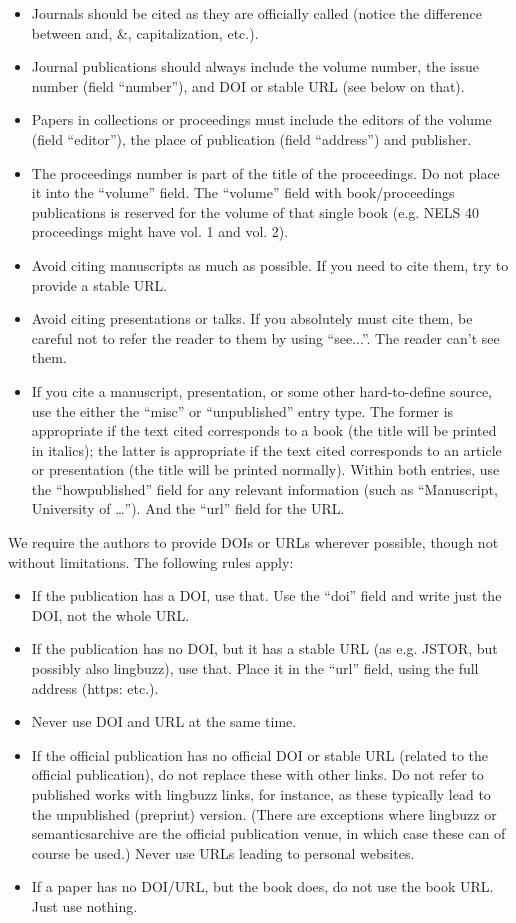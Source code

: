 \begin{itemize}
    \item Journals should be cited as they are officially called (notice the difference between and, \&, capitalization, etc.).
    \item Journal publications should always include the volume number, the issue number (field ``number''), and DOI or stable URL (see below on that).
    \item Papers in collections or proceedings must include the editors of the volume (field ``editor''), the place of publication (field ``address'') and publisher.
    \item The proceedings number is part of the title of the proceedings. Do not place it into the ``volume'' field. The ``volume'' field with book/proceedings publications is reserved for the volume of that single book (e.g. NELS 40 proceedings might have vol. 1 and vol. 2).
    \item Avoid citing manuscripts as much as possible. If you need to cite them, try to provide a stable URL.
    \item Avoid citing presentations or talks. If you absolutely must cite them, be careful not to refer the reader to them by using ``see...''. The reader can't see them.
    \item If you cite a manuscript, presentation, or some other hard-to-define source, use the either the ``misc'' or ``unpublished'' entry type. The former is appropriate if the text cited corresponds to a book (the title will be printed in italics); the latter is appropriate if the text cited corresponds to an article or presentation (the title will be printed normally). Within both entries, use the ``howpublished'' field for any relevant information (such as ``Manuscript, University of \dots''). And the ``url'' field for the URL.
\end{itemize}

We require the authors to provide DOIs or URLs wherever possible, though not without limitations. The following rules apply:

\begin{itemize}
    \item If the publication has a DOI, use that. Use the ``doi'' field and write just the DOI, not the whole URL.
    \item If the publication has no DOI, but it has a stable URL (as e.g. JSTOR, but possibly also lingbuzz), use that. Place it in the ``url'' field, using the full address (https: etc.).
    \item Never use DOI and URL at the same time.
    \item If the official publication has no official DOI or stable URL (related to the official publication), do not replace these with other links. Do not refer to published works with lingbuzz links, for instance, as these typically lead to the unpublished (preprint) version. (There are exceptions where lingbuzz or semanticsarchive are the official publication venue, in which case these can of course be used.) Never use URLs leading to personal websites.
    \item If a paper has no DOI/URL, but the book does, do not use the book URL. Just use nothing.
\end{itemize}